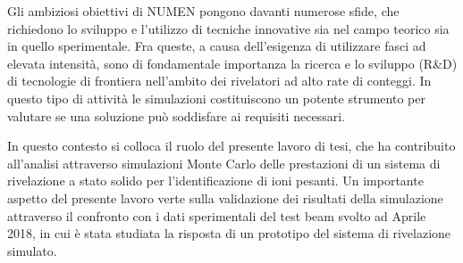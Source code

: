 Gli ambiziosi obiettivi di NUMEN pongono davanti numerose sfide, che richiedono lo sviluppo e l'utilizzo di tecniche innovative sia nel campo teorico sia in quello sperimentale. 
Fra queste, a causa dell'esigenza di utilizzare fasci ad elevata intensità, sono di fondamentale importanza la ricerca e lo sviluppo (R\&D) di tecnologie di frontiera nell'ambito dei rivelatori ad alto rate di conteggi.
In questo tipo di attività le simulazioni costituiscono un potente strumento per valutare se una soluzione può soddisfare ai requisiti necessari.

In questo contesto si colloca il ruolo del presente lavoro di tesi, che ha contribuito all'analisi attraverso simulazioni Monte Carlo delle prestazioni di un sistema di rivelazione a stato solido per l'identificazione di ioni pesanti.
Un importante aspetto del presente lavoro verte sulla validazione dei risultati della simulazione attraverso il confronto con i dati sperimentali del test beam svolto ad Aprile 2018, in cui è stata studiata la risposta di un prototipo del sistema di rivelazione simulato.




